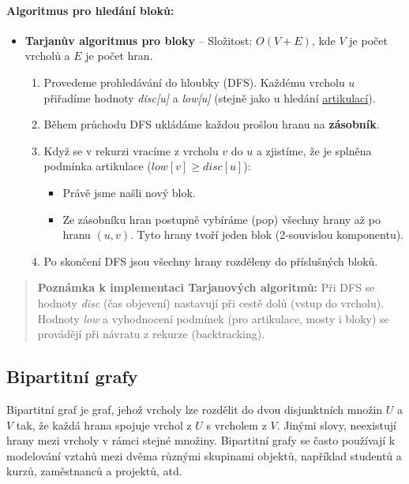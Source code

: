\paragraph*{Algoritmus pro hledání bloků:}
\begin{itemize}
\item \textbf{Tarjanův algoritmus pro bloky} -- Složitost: $O(V + E)$, kde $V$ je počet vrcholů a $E$ je počet hran.
\begin{enumerate}
    \item Provedeme prohledávání do hloubky (DFS). Každému vrcholu $u$ přiřadíme 
    hodnoty \textit{disc[u]} a \textit{low[u]} (stejně jako u hledání 
    \hyperref[para:artikulace]{artikulací}).
    \item Během průchodu DFS ukládáme každou prošlou hranu na \textbf{zásobník}.
    \item Když se v rekurzi vracíme z vrcholu $v$ do $u$ a zjistíme, že je splněna podmínka artikulace ($low[v] \geq disc[u]$):
    \begin{itemize}
        \item Právě jsme našli nový blok.
        \item Ze zásobníku hran postupně vybíráme (pop) všechny hrany až po hranu $(u, v)$. Tyto hrany tvoří jeden blok (2-souvislou komponentu).
    \end{itemize}
    \item Po skončení DFS jsou všechny hrany rozděleny do příslušných bloků.
\end{enumerate}
\end{itemize}

\begin{quote}
\textbf{Poznámka k implementaci Tarjanových algoritmů:} Při DFS se hodnoty \textit{disc} (čas objevení) nastavují při cestě dolů (vstup do vrcholu). Hodnoty \textit{low} a vyhodnocení podmínek (pro artikulace, mosty i bloky) se provádějí při návratu z rekurze (backtracking).
\end{quote}

\subsection{Bipartitní grafy}
Bipartitní graf je graf, jehož vrcholy lze rozdělit do 
dvou disjunktních množin $U$ a $V$ tak, že každá hrana spojuje vrchol z $U$ s vrcholem 
z $V$. Jinými slovy, neexistují hrany mezi vrcholy v rámci stejné množiny. Bipartitní 
grafy se často používají k modelování vztahů mezi dvěma různými skupinami objektů, 
například studentů a kurzů, zaměstnanců a projektů, atd.

